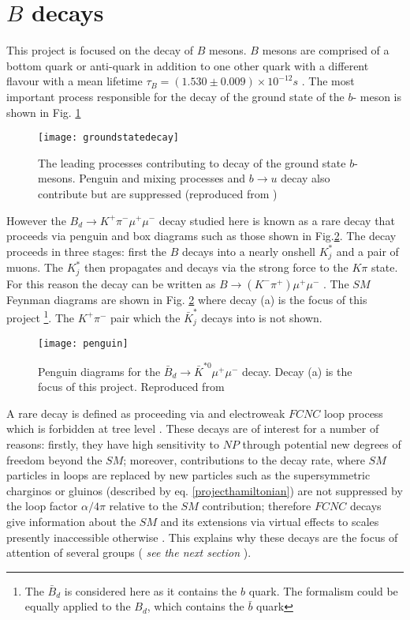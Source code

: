 \documentclass[a4paper,12pt]{article}
\begin{document}
\section{$B$ decays}
This project is focused on the decay of $B$ mesons. $B$ mesons are comprised of a bottom quark or anti-quark in addition to one other quark with a different flavour \cite{paper38} with a mean lifetime $\tau_B = (1.530\pm 0.009) \times 10^{-12} s$ \cite[p. 21]{paper1}.
The most important process responsible for the decay of the ground state of the $b$- meson is shown in Fig. \ref{figure1}
\begin{figure}[tb]
\begin{center}
\texttt{[image: groundstatedecay]}
\caption{The leading processes contributing to decay of the ground state $b$-mesons. Penguin and mixing processes and $b\to u$ decay also contribute but are suppressed (reproduced from \cite{barker})}
\end{center}
\label{figure1}
\end{figure}
However the $B_d  \rightarrow K^+  \pi^-\mu^+\mu^-$ decay studied here is known as a rare decay that proceeds via penguin and box diagrams such as those shown in  Fig.\ref{figure5}.
The decay proceeds in three stages: first the $B$ decays into a nearly onshell $K^{\ast}_j$ and a pair of muons. The $K^{\ast}_j$ then propagates and decays via the strong force to the $K\pi$ state. For this reason the decay can be written as $B\rightarrow (K^-\pi^{+})\mu^+\mu^-$ \cite{paper3}. The $SM$ Feynman diagrams are shown in Fig. \ref{figure5} where decay (a) is the focus of this project \footnote{The $\bar B_d$ is considered here as it contains the $b$ quark. The formalism could be equally applied to the $B_d$, which contains the $\bar b$ quark}. The $K^+\pi^-$ pair which the $\bar K^{\ast}_j$ decays into is not shown. 
\begin{figure}
\texttt{[image: penguin]}
\caption{Penguin diagrams for the $\bar B_d\rightarrow \bar K^{\ast 0}\mu^+\mu^-$ decay. Decay (a) is the focus of this project. Reproduced from \cite[p. 28]{paper1}}
\label{figure5}
\end{figure}


 A rare decay is defined as proceeding via and electroweak $FCNC$ loop process which is forbidden at tree level \cite[p. 21]{paper1}. These decays are of interest for a number of reasons: firstly, they have high sensitivity to $NP$ through potential new degrees of freedom beyond the $SM$; moreover, contributions to the decay rate, where $SM$ particles in loops are replaced by new particles such as the supersymmetric charginos or gluinos (described by eq. \ref{projecthamiltonian}) are not suppressed by the loop factor $\alpha/4\pi$ relative to the $SM$ contribution;
 therefore $FCNC$ decays give information about the $SM$ and its extensions via virtual effects to scales presently inaccessible otherwise \cite{paper39}. 
This explains why these decays are the focus of attention of several groups (\color{red}  {\it see the next section}\color{black} ).
\end{document}
